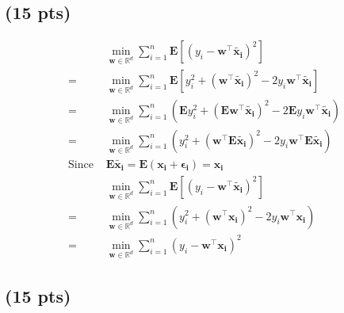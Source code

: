\documentclass{article}
\begin{document}
\subsection{(15 pts)} 
\begin{align*}
&\min_{\mathbf{w} \in \mathbb{R}^d} \sum_{i=1}^n \mathbf{E}[(y_i - \mathbf{w}^{\top}\tilde{\mathbf{x_i}})^2]\\
=&\min_{\mathbf{w} \in \mathbb{R}^d} \sum_{i=1}^n \mathbf{E}[y_i^2 + (\mathbf{w}^{\top}\tilde{\mathbf{x_i}})^2 - 2y_i\mathbf{w}^{\top}\tilde{\mathbf{x_i}}]\\
=&\min_{\mathbf{w} \in \mathbb{R}^d} \sum_{i=1}^n (\mathbf{E}y_i^2 + (\mathbf{E}\mathbf{w}^{\top}\tilde{\mathbf{x_i}})^2 - 2\mathbf{E}y_i\mathbf{w}^{\top}\tilde{\mathbf{x_i}})\\
=&\min_{\mathbf{w} \in \mathbb{R}^d} \sum_{i=1}^n (y_i^2 + (\mathbf{w}^{\top}\mathbf{E}\tilde{\mathbf{x_i}})^2 - 2y_i\mathbf{w}^{\top}\mathbf{E}\tilde{\mathbf{x_i}})\\
\text{Since  } & \mathbf{E}\tilde{\mathbf{x_i}} = \mathbf{E} (\mathbf{x_i + \epsilon_i}) = \mathbf{x_i}\\
&\min_{\mathbf{w} \in \mathbb{R}^d} \sum_{i=1}^n \mathbf{E}[(y_i - \mathbf{w}^{\top}\tilde{\mathbf{x_i}})^2]\\
=&\min_{\mathbf{w} \in \mathbb{R}^d} \sum_{i=1}^n (y_i^2 + (\mathbf{w}^{\top}\mathbf{x_i})^2 - 2y_i\mathbf{w}^{\top}\mathbf{x_i})\\
=&\min_{\mathbf{w} \in \mathbb{R}^d} \sum_{i=1}^n (y_i - \mathbf{w}^{\top}\mathbf{x_i})^2
\end{align*}
\subsection{(15 pts)} 
\nocite{*}
\end{document}
